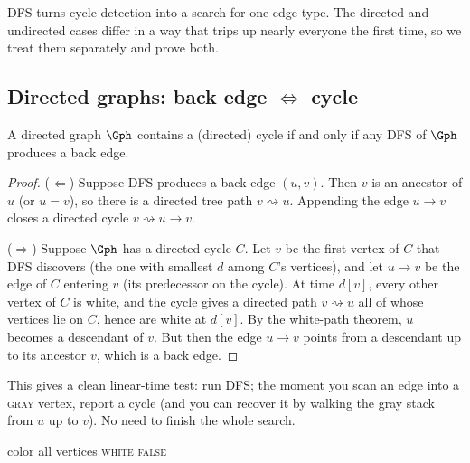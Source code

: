 DFS turns cycle detection into a search for one edge type. The directed and undirected cases differ in a way that trips up nearly everyone the first time, so we treat them separately and prove both.

\subsection{Directed graphs: back edge $\iff$ cycle}

\begin{theorem}\label{ch03:thm-dircycle}
A directed graph $\Gph$ contains a (directed) cycle if and only if any DFS of $\Gph$ produces a back edge.
\end{theorem}

\begin{proof}
($\Leftarrow$) Suppose DFS produces a back edge $(u,v)$. Then $v$ is an ancestor of $u$ (or $u=v$), so there is a directed tree path $v\rightsquigarrow u$. Appending the edge $u\to v$ closes a directed cycle $v\rightsquigarrow u\to v$.

($\Rightarrow$) Suppose $\Gph$ has a directed cycle $C$. Let $v$ be the first vertex of $C$ that DFS discovers (the one with smallest $d$ among $C$'s vertices), and let $u\to v$ be the edge of $C$ entering $v$ (its predecessor on the cycle). At time $d[v]$, every other vertex of $C$ is white, and the cycle gives a directed path $v\rightsquigarrow u$ all of whose vertices lie on $C$, hence are white at $d[v]$. By the white-path theorem, $u$ becomes a descendant of $v$. But then the edge $u\to v$ points from a descendant up to its ancestor $v$, which is a back edge.
\end{proof}

This gives a clean linear-time test: run DFS; the moment you scan an edge into a \textsc{gray} vertex, report a cycle (and you can recover it by walking the gray stack from $u$ up to $v$). No need to finish the whole search.

\begin{algorithm}[H]
\DontPrintSemicolon
{}
\BlankLine
color all vertices \textsc{white}\;
\Return \textsc{false}\;
\BlankLine
{}
\caption{Directed cycle detection via gray vertices}
\label{ch03:alg-dircycle}
\end{algorithm}

